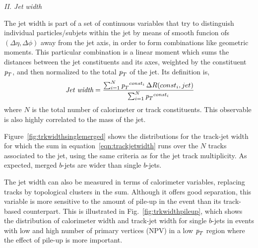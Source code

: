 { \em II. Jet width}
\vspace{3 mm}

The jet width is part of a set of continuous variables that try to distinguish individual particles/subjets within the jet by means of smooth funcion ofs $(\Delta \eta, \Delta \phi)$ away from the jet axis, in order to form combinations like geometric moments.  This particular combination is a linear moment which sums the distances between the jet constituents and its axes, weighted by the constituent ${\emph{p}_{T}}$, and then normalized to the total ${\emph{p}_{T}}$ of the jet.  Its definition is,
%
\begin{equation} 
\mbox{ {\it Jet width}} = \frac{\sum_{i=1}^N {\emph{p}_{T}}^{const_i} \,\Delta R (const_i,jet) }{\sum_{i=1}^N {\emph{p}_{T}}^{const_i} }
\label{eqn:trackjetwidth}
\end{equation} 
%
where $N$ is the total number of calorimeter or track constituents.  This observable is also highly correlated to the mass of the jet.


Figure~\ref{fig:trkwidthsinglemerged} shows the distributions for the track-jet width for which the sum in equation~\ref{eqn:trackjetwidth} runs over the $N$ tracks associated to the jet, using the same criteria as for the jet track multiplicity. %
As expected, merged $b$-jets are wider than single $b$-jets. 


The jet width can also be measured in terms of calorimeter variables, replacing tracks by topological clusters in the sum.  Although it offers good separation, this variable is more sensitive to the amount of pile-up in the event than its track-based counterpart. This is illustrated in Fig.~\ref{fig:trkwidthpileup}, which shows the distribution of calorimeter width and track-jet width for single $b$-jets in events with low and high number of primary vertices (NPV) in a low ${\emph{p}_{T}}$ region where the effect of pile-up is more important. 

